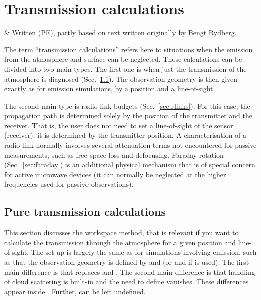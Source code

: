 \chapter{Transmission calculations}
 \label{sec:trans}

 & Written (PE), partly based on text written originally by 
          Bengt Rydberg.
\stophistory

\graphicspath{{Figs/transmission/}}

The term ``transmission calculations'' refers here to situations when the
emission from the atmosphere and surface can be neglected. These
calculations can be divided into two main types. The first one is when just the
transmission of the atmosphere is diagnosed (Sec.~\ref{sec:transmission}). The
observation geometry is then given exactly as for emission simulations, by a
position and a line-of-sight.

The second main type is radio link budgets (Sec.~\ref{sec:rlinks}). For this
case, the propagation path is determined solely by the position of the
transmitter and the receiver. That is, the user does not need to set a
line-of-sight of the sensor (receiver), it is determined by the transmitter
position. A characterisation of a radio link normally involves several
attenuation terms not encountered for passive measurements, such as free space
loss and defocusing. Faraday rotation (Sec.~\ref{sec:faraday}) is an additional
physical mechanism that is of special concern for active microwave devices (it
can normally be neglected at the higher frequencies used for passive
observations).




\section{Pure transmission calculations}
\label{sec:transmission}

This section discusses the  workspace method,
that is relevant if you want to calculate the transmission through the
atmosphere for a given position and line-of-sight. The set-up is largely the
same as for simulations involving emission, such as that the observation
geometry is defined by  and  (or
 and  if  is used).
The first main difference is that  replaces
 and . The second
main difference is that handling of cloud scattering is built-in and the need
to define  vanishes. These differences appear
inside . Further,
 can be left undefined.

